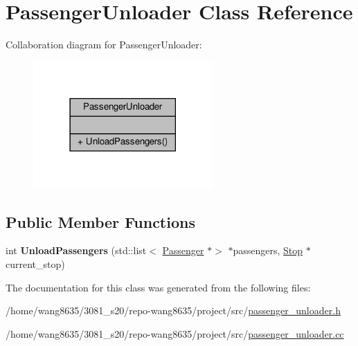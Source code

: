 \hypertarget{classPassengerUnloader}{}\section{Passenger\+Unloader Class Reference}
\label{classPassengerUnloader}


Collaboration diagram for Passenger\+Unloader\+:\nopagebreak
\begin{figure}[H]
\begin{center}
\leavevmode
\includegraphics[width=194pt]{classPassengerUnloader__coll__graph}
\end{center}
\end{figure}
\subsection*{Public Member Functions}
\begin{DoxyCompactItemize}
\item 
\mbox{\label{classPassengerUnloader_a571ee51523a6bce30fb843174eaad4a2}} 
int {\bfseries Unload\+Passengers} (std\+::list$<$ \hyperlink{classPassenger}{Passenger} $\ast$$>$ $\ast$passengers, \hyperlink{classStop}{Stop} $\ast$current\+\_\+stop)
\end{DoxyCompactItemize}


The documentation for this class was generated from the following files\+:\begin{DoxyCompactItemize}
\item 
/home/wang8635/3081\+\_\+s20/repo-\/wang8635/project/src/\hyperlink{passenger__unloader_8h}{passenger\+\_\+unloader.\+h}\item 
/home/wang8635/3081\+\_\+s20/repo-\/wang8635/project/src/\hyperlink{passenger__unloader_8cc}{passenger\+\_\+unloader.\+cc}\end{DoxyCompactItemize}
